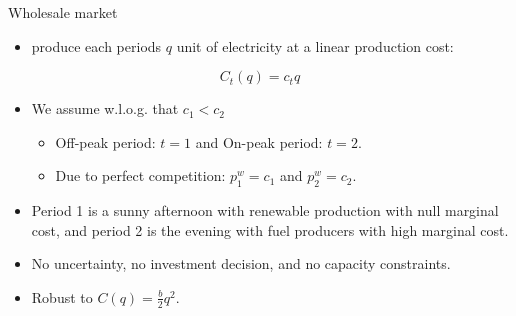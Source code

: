 \documentclass{class}
\begin{document}
\begin{frame}{Wholesale market}


\begin{itemize}
    \item {} produce each periods $q$ unit of electricity at a linear production cost: 
\end{itemize}

\begin{equation*}
    C_t(q) = c_t q
\end{equation*}

\vfill

\begin{itemize}
    \item We assume w.l.o.g. that $c_1 < c_2$

\vfill

\begin{itemize}
    \item Off-peak period: $t = 1$ and On-peak period: $t = 2$. \vfill
    \item Due to perfect competition: $p_1^w = c_1$ and $p_2^w = c_2$.
\end{itemize}

\vfill

\item Period 1 is a sunny afternoon with renewable production with null marginal cost, and period 2 is the evening with fuel producers with high marginal cost.


\vfill

\item  No uncertainty, no investment decision, and no capacity constraints.

\vfill

\item Robust to $\displaystyle C(q) = \frac{b}{2} q^2$.


\end{itemize}
    
\end{frame}

\end{document}
